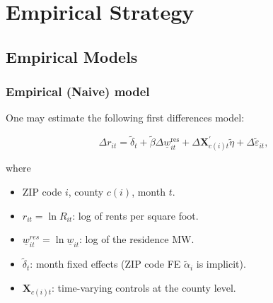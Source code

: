 \documentclass[aspectratio=169, t]{beamer}
\newcommand{\MW}{\underline{w}}
\begin{document}
\section{Empirical Strategy}

\subsection{Empirical Models}

\begin{frame}[label = stat_only_model]
	\frametitle{Empirical (Naive) model}
	
	One may estimate the following first differences model:
	
	$$
	\Delta r_{it} = \tilde\delta_t + 
	\tilde\beta \Delta \MW^{\text{res}}_{it} + 
	\Delta \mathbf{X}^{'}_{c(i)t} \tilde\eta + 
	\Delta \tilde\varepsilon_{it} ,
	$$
	
	where	
	\begin{itemize} \small
	\item ZIP code $i$, county $c(i)$, month $t$.
	
	\item \vspace{1mm} $r_{it} = \ln R_{it}$: log of rents per square foot.
	
	\item \vspace{1mm} $\MW^{res}_{it} = \ln \MW_{it}$: log of the residence MW.
	
	\item \vspace{1mm} $\tilde\delta_t$: month fixed effects (ZIP code FE $\tilde\alpha_i 
	$ is 
	implicit).
	
	\item \vspace{.5mm} $\mathbf{X}_{c(i)t}$: time-varying controls at the county level.
	\end{itemize}
\end{frame}
\end{document}
